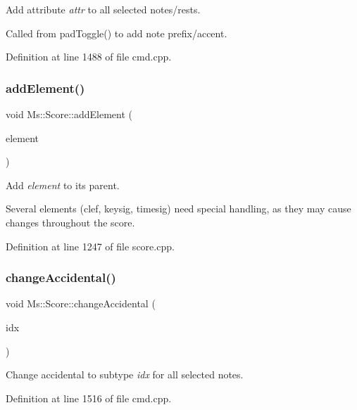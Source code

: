 Add attribute {\itshape attr} to all selected notes/rests.

Called from pad\+Toggle() to add note prefix/accent. 

Definition at line 1488 of file cmd.\+cpp.

\mbox{\label{class_ms_1_1_score_ac1ed7b10bdb1a93929c135025dc400ee}} 
\subsubsection{\texorpdfstring{add\+Element()}{addElement()}}
{\footnotesize\ttfamily void Ms\+::\+Score\+::add\+Element (\begin{DoxyParamCaption}\item[{\hyperlink{class_ms_1_1_element}{Element} $\ast$}]{element }\end{DoxyParamCaption})}

Add {\itshape element} to its parent.

Several elements (clef, keysig, timesig) need special handling, as they may cause changes throughout the score. 

Definition at line 1247 of file score.\+cpp.

\mbox{\label{class_ms_1_1_score_ae15192465613fd2cfb2daf4054a92e12}} 
\subsubsection{\texorpdfstring{change\+Accidental()}{changeAccidental()}\hspace{0.1cm}{\footnotesize\ttfamily [1/2]}}
{\footnotesize\ttfamily void Ms\+::\+Score\+::change\+Accidental (\begin{DoxyParamCaption}\item[{Accidental\+Type}]{idx }\end{DoxyParamCaption})}

Change accidental to subtype {\itshape idx} for all selected notes. 

Definition at line 1516 of file cmd.\+cpp.

\mbox{\label{class_ms_1_1_score_abc8c7ac07ffae5fcf314118f416527e2}} 
